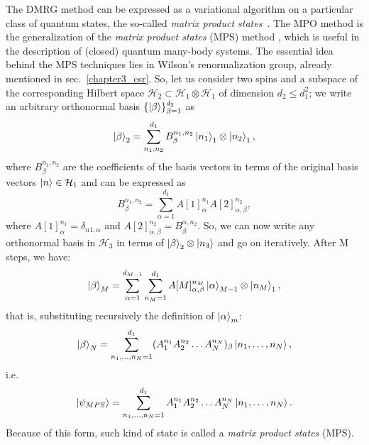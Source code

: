 The DMRG method can be expressed as a variational algorithm on a particular class of quantum states, the so-called \emph{matrix product states}~\cite{SCHOLLWOCK201196}.
The MPO method is the generalization of the \emph{matrix product states} (MPS) method \cite{SCHOLLWOCK201196}, which is useful in the description of (closed) quantum many-body systems. The essential idea~\cite{Cirac_2009} behind the MPS techniques lies in Wilson's renormalization group, already mentioned in sec.~\ref{chapter3_csr}.
So, let us consider two spins and a subspace of the corresponding Hilbert space $\mathcal{H}_2 \subset \mathcal{H}_1 \otimes \mathcal{H}_1$ of dimension $d_2 \leq d_1^2$; we write an arbitrary orthonormal basis $\{\ket{\beta}\}_{\beta=1}^{d_2}$ as
\begin{equation*}
    \ket{\beta}_2 = \sum_{n_1, n_2}^{d_{1}} B_\beta^{n_1, n_2} \ket{n_1}_1 \otimes \ket{n_2}_1,
\end{equation*}
where $B_\beta^{n_1, n_2}$ are the coefficients of the basis vectors in terms of the original basis vectors $\ket{n} \in \mathcal{H}_1$ and can be expressed as
\begin{equation*}
    B_\beta^{n_1, n_2} = \sum_{\alpha=1}^{d_{1}} A[1]_\alpha^{n_1}A[2]_{\alpha,\beta}^{n_2},
\end{equation*}
where $A[1]_\alpha^{n_1} = \delta_{n1, \alpha}$ and $A[2]_{\alpha,\beta}^{n_2} = B_\beta^{\alpha, n_2}$. So, we can now write any orthonormal basis in $\mathcal{H}_3$ in terms of $\ket{\beta}_2\otimes \ket{n_3}$ and go on iteratively. After M steps, we have:
\begin{equation*}
    \ket{\beta}_M = \sum_{\alpha=1}^{d_{M-1}}\sum_{n_M=1}^{d_1} A[M]_{\alpha,\beta}^{n_M}\ket{\alpha}_{M-1}\otimes\ket{n_M}_1,
\end{equation*}
that is, substituting recursively the definition of $\ket{\alpha}_m$:
\begin{equation*}
    \ket{\beta}_N = \sum_{n_1,\dots,n_N=1}^{d_1} (A_1^{n_1}A_2^{n_2}\dots A_N^{n_N})_\beta \ket{n_1,\dots,n_N},
\end{equation*}
i.e.
\begin{equation}
\label{mps_general}
    \ket{\psi_{MPS}} = \sum_{n_1,\dots,n_N=1}^{d_1} A_1^{n_1}A_2^{n_2}\dots A_N^{n_N} \ket{n_1,\dots,n_N}.
\end{equation}
Because of this form, such kind of state is called a \emph{matrix product states} (MPS). %

